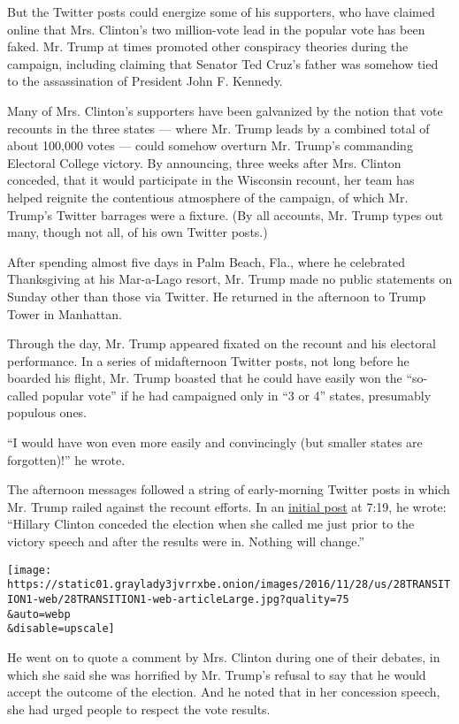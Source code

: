 But the Twitter posts could energize some of his supporters, who have
claimed online that Mrs. Clinton's two million-vote lead in the popular
vote has been faked. Mr. Trump at times promoted other conspiracy
theories during the campaign, including claiming that Senator Ted Cruz's
father was somehow tied to the assassination of President John F.
Kennedy.

Many of Mrs. Clinton's supporters have been galvanized by the notion
that vote recounts in the three states --- where Mr. Trump leads by a
combined total of about 100,000 votes --- could somehow overturn Mr.
Trump's commanding Electoral College victory. By announcing, three weeks
after Mrs. Clinton conceded, that it would participate in the Wisconsin
recount, her team has helped reignite the contentious atmosphere of the
campaign, of which Mr. Trump's Twitter barrages were a fixture. (By all
accounts, Mr. Trump types out many, though not all, of his own Twitter
posts.)

After spending almost five days in Palm Beach, Fla., where he celebrated
Thanksgiving at his Mar-a-Lago resort, Mr. Trump made no public
statements on Sunday other than those via Twitter. He returned in the
afternoon to Trump Tower in Manhattan.

Through the day, Mr. Trump appeared fixated on the recount and his
electoral performance. In a series of midafternoon Twitter posts, not
long before he boarded his flight, Mr. Trump boasted that he could have
easily won the ``so-called popular vote'' if he had campaigned only in
``3 or 4'' states, presumably populous ones.

``I would have won even more easily and convincingly (but smaller states
are forgotten)!'' he wrote.

The afternoon messages followed a string of early-morning Twitter posts
in which Mr. Trump railed against the recount efforts. In an
\href{https://twitter.com/realDonaldTrump/status/802849330176659456}{initial
post} at 7:19, he wrote: ``Hillary Clinton conceded the election when
she called me just prior to the victory speech and after the results
were in. Nothing will change.''

\texttt{[image: https://static01.graylady3jvrrxbe.onion/images/2016/11/28/us/28TRANSITION1-web/28TRANSITION1-web-articleLarge.jpg?quality=75\\\&auto=webp\\\&disable=upscale]}

He went on to quote a comment by Mrs. Clinton during one of their
debates, in which she said she was horrified by Mr. Trump's refusal to
say that he would accept the outcome of the election. And he noted that
in her concession speech, she had urged people to respect the vote
results.

